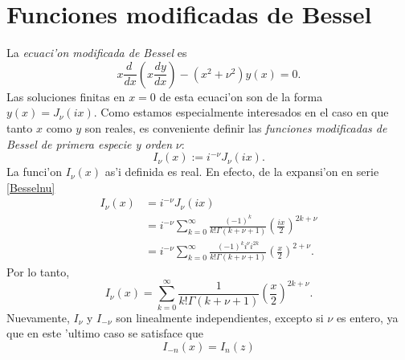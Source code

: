 
\section{Funciones modificadas de Bessel}
La \textit{ecuaci'on modificada de Bessel} es 
\begin{equation}\label{Besselec1}
x\frac{d\ }{dx}\left(x\frac{dy}{dx}\right)-(x^2+\nu^2)y(x)=0.
\end{equation}
Las soluciones finitas en $x=0$ de esta ecuaci'on son de la forma $y(x)=J_\nu(ix)$. Como estamos especialmente interesados en el caso en que tanto $x$ como $y$ son reales, es conveniente  definir las \textit{funciones modificadas de Bessel de primera especie y orden} $\nu$:
\begin{equation}\label{defInu}
I_\nu(x) := i^{-\nu} J_\nu(ix). 
\end{equation}
La funci'on $I_\nu(x)$ as'i definida es real. En efecto, de la expansi'on en serie \eqref{Besselnu}
\begin{align}
  I_\nu(x) &= i^{-\nu} J_\nu(ix)   \\
  &= i^{-\nu}\sum_{k=0}^\infty\frac{(-1)^k}{k!\Gamma(k+\nu+1)}
  \left(\frac{ix}{2}\right)^{2k+\nu} \\
  &= i^{-\nu} \sum_{k=0}^\infty \frac{(-1)^k i^\nu i^{2k}}{k!\Gamma(k+\nu+1)} 
  \left(\frac{x}{2}\right)^{2+\nu}.
\end{align}
Por lo tanto,
\begin{equation}
\boxed{I_\nu(x) = \sum_{k=0}^\infty\frac{1}{k!\Gamma(k+\nu+ 1)}
  \left(\frac{x}{2}\right)^{2k+\nu}.}
\end{equation}
Nuevamente, $I_\nu$ y $I_{-\nu}$ son linealmente independientes, excepto si $\nu$ es entero, ya que en este 'ultimo caso se satisface que
\begin{equation}
I_{-n}(x)=I_n(z)
\end{equation}
